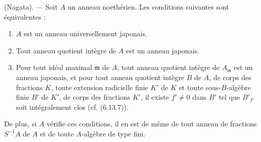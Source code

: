 \begin{theorem}[7.7.2]
\label{IV.2.s7.7.2-fr}
(Nagata). --- Soit $A$ un anneau noethérien. Les conditions suivantes sont
équivalentes :
\begin{enumerate}
\item[\emph{a)}] $A$ est un anneau universellement japonais.
\item[\emph{b)}] Tout anneau quotient intègre de $A$ est un anneau japonais.
\item[\emph{c)}] Pour tout idéal maximal $\mathfrak m$ de $A$, tout anneau
quotient intègre de $A_{\mathfrak m}$ est un anneau japonais, et pour tout
anneau quotient intègre $B$ de $A$, de corps des fractions $K$, toute
extension radicielle finie $K'$ de $K$ et toute sous-$B$-algèbre finie $B'$ de
$K'$, de corps des fractions $K'$, il existe $f'\neq0$ dans $B'$ tel que
$B'_{f'}$ soit intégralement clos (cf. (6.13.7)).
\end{enumerate}
De plus, si $A$ vérifie ces conditions, il en est de même de tout anneau de
fractions $S^{-1}A$ de $A$ et de toute $A$-algèbre de type fini.
\end{theorem}

